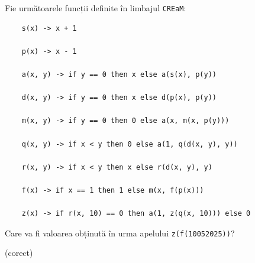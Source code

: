 \documentclass{exam}
\begin{document}
\noindent
Fie următoarele funcții definite în limbajul \texttt{CREaM}:

\begin{lstlisting}
    s(x) -> x + 1

    p(x) -> x - 1

    a(x, y) -> if y == 0 then x else a(s(x), p(y))

    d(x, y) -> if y == 0 then x else d(p(x), p(y))

    m(x, y) -> if y == 0 then 0 else a(x, m(x, p(y)))

    q(x, y) -> if x < y then 0 else a(1, q(d(x, y), y))

    r(x, y) -> if x < y then x else r(d(x, y), y)

    f(x) -> if x == 1 then 1 else m(x, f(p(x)))

    z(x) -> if r(x, 10) == 0 then a(1, z(q(x, 10))) else 0
\end{lstlisting}

\noindent
Care va fi valoarea obținută în urma apelului \texttt{z(f(10052025))}?

\begin{oneparchoices}
  (corect)
\end{oneparchoices}
\end{document}
